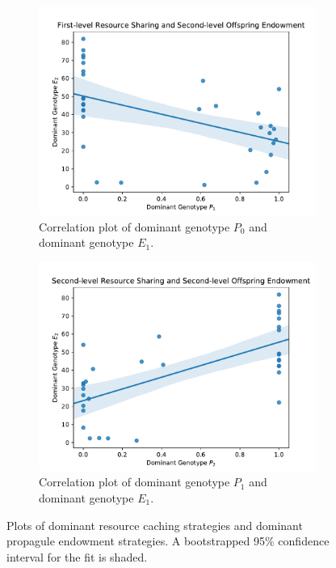 \begin{figure}[t]
\begin{center}

\begin{subfigure}[b]{0.5\columnwidth}
  \includegraphics[width=\columnwidth]{img/champion_res_pool1_vs_champion_endowment2}
  \caption{
  Correlation plot of dominant genotype $P_0$ and dominant genotype $E_1$.
  }
  \label{fig:champion_res_pool1_vs_champion_endowment2}
\end{subfigure}%
\begin{subfigure}[b]{0.5\columnwidth}
  \includegraphics[width=\columnwidth]{img/champion_res_pool2_vs_champion_endowment2}
  \caption{
  Correlation plot of dominant genotype $P_1$ and dominant genotype $E_1$.
  }
  \label{fig:champion_res_pool2_vs_champion_endowment2}
\end{subfigure}

\caption{
Plots of dominant resource caching strategies and dominant propagule endowment strategies.
A bootstrapped 95\% confidence interval for the fit is shaded.
}
\label{fig:endowment}
\end{center}
\end{figure}

